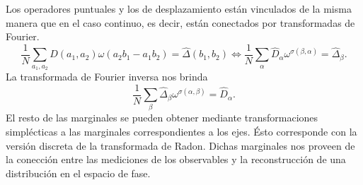  Los operadores puntuales y los de desplazamiento están
  vinculados de la misma manera que en el caso continuo, es
  decir, están conectados por transformadas de Fourier.
  \[
    \frac{1}{N}
    \sum_{a_1,a_2}^{} \hat{D}(a_1,a_2)\omega(a_2b_1-a_1b_2)
    = \hat{\Delta}(b_1,b_2)
    \iff
    \frac{1}{N} \sum_{\alpha}^{} \hat{D}_{\alpha}
    \omega^{\sigma(\beta,\alpha)} 
    = \hat{\Delta}_\beta.
  \] 
  La transformada de Fourier inversa nos brinda 
  \[
    \frac{1}{N} \sum_{\beta}^{} \hat{\Delta}_\beta
    \omega^{\sigma(\alpha,\beta)}
    = \hat{D}_\alpha.
  \] 
  El resto de las marginales se pueden obtener mediante
  transformaciones simplécticas a las marginales
  correspondientes a los ejes. Ésto corresponde con la
  versión discreta de la transformada de Radon. Dichas
  marginales nos proveen de la conección entre las
  mediciones de los observables y la reconstrucción de una
  distribución en el espacio de fase.

